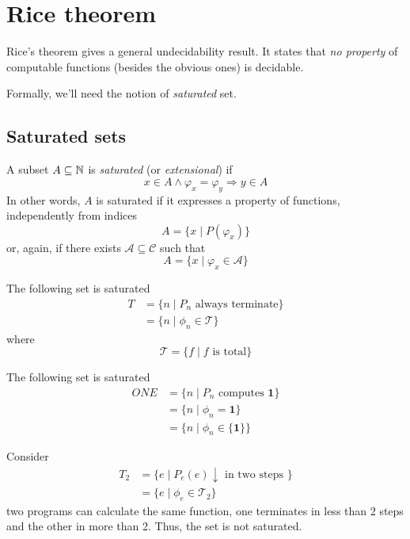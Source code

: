 \chapter {Rice theorem}

Rice's theorem gives a general undecidability result. It states that \emph{no property} of computable functions
(besides the obvious ones) is decidable.

Formally, we'll need the notion of \emph{saturated} set.
\section{Saturated sets}
\begin{definition}
  A subset $A \subseteq \mathbb{N}$ is \emph{saturated} (or \emph{extensional}) if
  \[
     x \in A \wedge \varphi_x = \varphi_y \Rightarrow y \in A 
  \]
  In other words, $A$ is saturated if it expresses a property of
functions, independently from indices
\[A = \{x \mid P(\varphi_x)\}\]
or, again, if there exists $\mathcal{A} \subseteq \mathcal{C}$ such that
\[A = \{ x \mid \varphi_x \in \mathcal{A}\}\]
\end{definition}

\begin{example}
  The following set is saturated
  \begin{align*}
    T &= \{ n \mid P_n \mbox{ always terminate} \} \\
    &= \{n \mid \phi_n \in \mathcal{T} \}
  \end{align*}
  where
  \[ \mathcal{T} = \{ f \mid f \mbox{ is total} \} \]
\end{example}

\begin{example}
  The following set is saturated
  \begin{align*}
    ONE &= \{ n \mid P_n \mbox{ computes } \mathbf{1}\} \\
    &= \{n \mid \phi_n = \mathbf{1} \} \\
    &= \{n \mid \phi_n \in \{ \mathbf{1} \} \}
  \end{align*}
\end{example}

\begin{example}
  Consider
  \begin{align*}
    T_2 &= \{ e \mid P_e(e)\downarrow \mbox{ in two steps } \} \\
    &=
    \{e \mid \phi_e \in \mathcal{T}_2 \}
  \end{align*}
  two programs can calculate the same function, one terminates in
  less than 2 steps and the other in more than 2. Thus, the set is not
  saturated.
\end{example}


